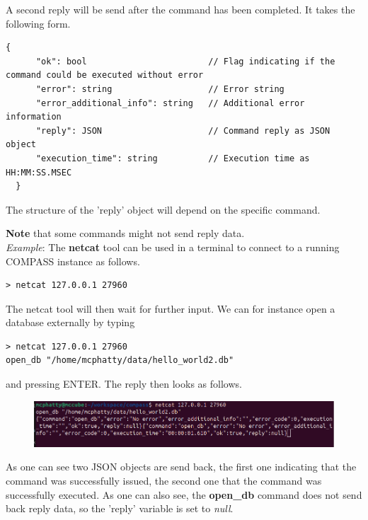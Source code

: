 A second reply will be send after the command has been completed. It takes the following form.

\begin{lstlisting}[basicstyle=\small\ttfamily]
  {
      "ok": bool                        // Flag indicating if the command could be executed without error 
      "error": string                   // Error string
      "error_additional_info": string   // Additional error information 
      "reply": JSON                     // Command reply as JSON object
      "execution_time": string          // Execution time as HH:MM:SS.MSEC
  }
  \end{lstlisting}

The structure of the 'reply' object will depend on the specific command. 

\textbf{Note} that some commands might not send reply data. \\

\textit{Example}: The \textbf{netcat} tool can be used in a terminal to connect to a running COMPASS instance as follows.

\begin{lstlisting}[basicstyle=\small\ttfamily]
> netcat 127.0.0.1 27960
\end{lstlisting}

The netcat tool will then wait for further input. We can for instance open a database externally by typing

\begin{lstlisting}[basicstyle=\small\ttfamily]
> netcat 127.0.0.1 27960
open_db "/home/mcphatty/data/hello_world2.db"
\end{lstlisting}

and pressing ENTER. The reply then looks as follows.

\begin{figure}[H]
  \center
  \includegraphics[width=15cm,frame]{figures/netcat_example.png}
\end{figure}

As one can see two JSON objects are send back, the first one 
indicating that the command was successfully issued, the second one that the command 
was successfully executed. As one can also see, the \textbf{open\_db} command does not 
send back reply data, so the 'reply' variable is set to \textit{null}.

